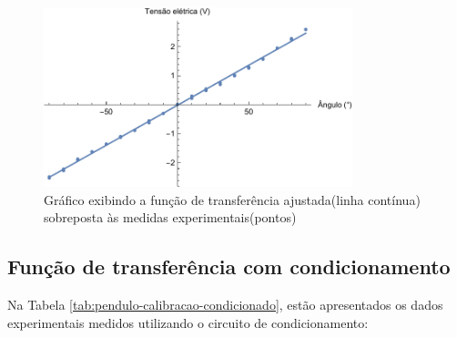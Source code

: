 \documentclass[a4paper]{instrumentacao}
\begin{document}
\begin{figure}[]
\centering
\includegraphics[width=0.8\textwidth]{Pendulo-fit.pdf}
\caption{Gráfico exibindo a função de transferência ajustada(linha contínua) sobreposta às medidas experimentais(pontos)}
\label{fig:pendulo-tf-sem-cond}
\end{figure}

\subsection{Função de transferência com condicionamento}

Na Tabela \ref{tab:pendulo-calibracao-condicionado}, estão apresentados os dados experimentais medidos utilizando o circuito de condicionamento:
\end{document}
